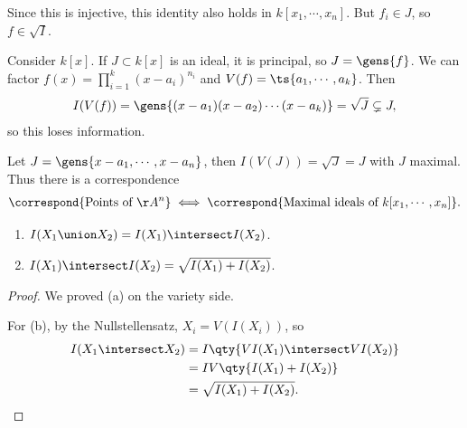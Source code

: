 Since this is injective, this identity also holds in
\(k[x_1, \cdots, x_n]\). But \(f_i\in J\), so \(f\in \sqrt{I}\).

\begin{example}

Consider \(k[x]\). If \(J\subset k[x]\) is an ideal, it is principal, so
\(J = \gens{f}\). We can factor \(f(x) = \prod_{i=1}^k (x-a_i)^{n_i}\)
and \(V(f) = \ts{a_1, \cdots, a_k}\). Then
\begin{align*}
I(V(f)) = \gens{(x-a_1)(x-a_2)\cdots(x-a_k)} = \sqrt{J} \subsetneq J
,\end{align*} so this loses information.

\end{example}

\begin{example}

Let \(J = \gens{x-a_1, \cdots, x-a_n}\), then \(I(V(J)) = \sqrt{J} = J\)
with \(J\) maximal. Thus there is a correspondence
\begin{align*}  
\correspond{\text{Points of } \AA^n} \iff 
\correspond{\text{Maximal ideals of }k[x_1, \cdots, x_n]}
.\end{align*}

\end{example}

\begin{theorem}[Properties of $I$]

\hfill

\begin{enumerate}
\def\labelenumi{\alph{enumi}.}
\item
  \(I(X_1 \union X_2) = I(X_1) \intersect I(X_2)\).
\item
  \(I(X_1) \intersect I(X_2) = \sqrt{I(X_1) + I(X_2)}\).
\end{enumerate}

\end{theorem}

\begin{proof}

We proved (a) on the variety side.

For (b), by the Nullstellensatz, \(X_i = V(I(X_i))\), so
\begin{align*}  
I(X_1\intersect X_2) 
&=
I\qty{ VI(X_1) \intersect VI(X_2)} \\
&=
IV\qty{I(X_1) + I(X_2)} \\
&= \sqrt{I(X_1) + I(X_2)}
.\end{align*}

\end{proof}

